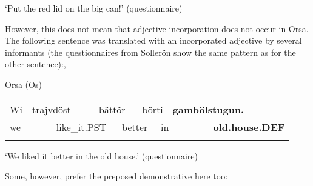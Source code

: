 \begin{styleTranslation}
‘Put the red lid on the big can!’ (questionnaire)

\end{styleTranslation}

\begin{styleBodyTextFirst}
However, this does not mean that adjective incorporation does not occur in Orsa. The following sentence was translated with an incorporated adjective by several informants (the questionnaires from Sollerön show the same pattern as for the other sentence):,

\end{styleBodyTextFirst}

\begin{listWWNumileveli}
\item {}

\begin{styleExample}
Orsa (Os)

\end{styleExample}

\end{listWWNumileveli}

\begin{tabular}{llllllllll}
\lsptoprule
Wi & \multicolumn{2}{l}{trajvdöst

} & \multicolumn{2}{l}{bättör

} & \multicolumn{2}{l}{börti

} & \multicolumn{2}{l}{{\bfseries gambölstugun.}

} & \\
\multicolumn{2}{l}{we

} & \multicolumn{2}{l}{like\_it.PST

} & \multicolumn{2}{l}{better

} & \multicolumn{2}{l}{in

} & \multicolumn{2}{l}{{\bfseries old.house.DEF}

}\\
\lspbottomrule
\end{tabular}

\begin{styleTranslation}
‘We liked it better in the old house.’ (questionnaire)

\end{styleTranslation}

\begin{styleBodyTextFirst}
Some, however, prefer the preposed demonstrative here too:

\end{styleBodyTextFirst}

